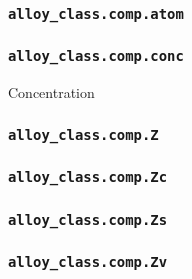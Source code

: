 \subsubsection{\texttt{alloy\_class.comp.atom}}
\subsubsection{\texttt{alloy\_class.comp.conc}}
Concentration
\subsubsection{\texttt{alloy\_class.comp.Z}}
\subsubsection{\texttt{alloy\_class.comp.Zc}}
\subsubsection{\texttt{alloy\_class.comp.Zs}}
\subsubsection{\texttt{alloy\_class.comp.Zv}}


